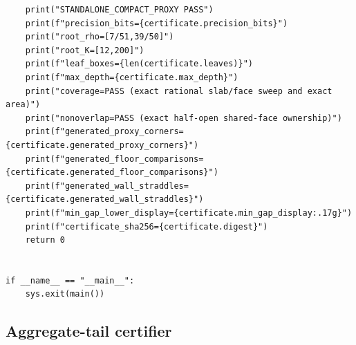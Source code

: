 \documentclass[11pt]{article}
\numberwithin{equation}{section}
\theoremstyle{definition}
\theoremstyle{remark}
\begin{document}
\begin{lstlisting}
    print("STANDALONE_COMPACT_PROXY PASS")
    print(f"precision_bits={certificate.precision_bits}")
    print("root_rho=[7/51,39/50]")
    print("root_K=[12,200]")
    print(f"leaf_boxes={len(certificate.leaves)}")
    print(f"max_depth={certificate.max_depth}")
    print("coverage=PASS (exact rational slab/face sweep and exact area)")
    print("nonoverlap=PASS (exact half-open shared-face ownership)")
    print(f"generated_proxy_corners={certificate.generated_proxy_corners}")
    print(f"generated_floor_comparisons={certificate.generated_floor_comparisons}")
    print(f"generated_wall_straddles={certificate.generated_wall_straddles}")
    print(f"min_gap_lower_display={certificate.min_gap_display:.17g}")
    print(f"certificate_sha256={certificate.digest}")
    return 0


if __name__ == "__main__":
    sys.exit(main())
\end{lstlisting}

\subsection{Aggregate-tail certifier}
\end{document}
